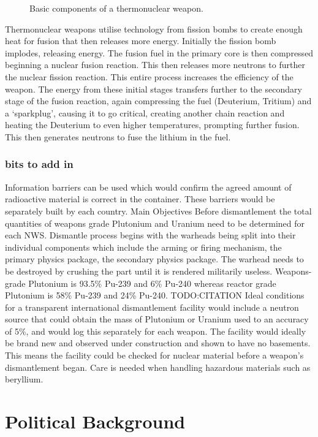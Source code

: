 \documentclass[twoside,titlepage,11pt,twocolumn,a4paper]{article}
\begin{document}
\begin{figure}
  
  \caption{Basic components of a thermonuclear weapon.
    \citep{thermonuclearBomb}}
\end{figure}

Thermonuclear weapons utilise technology from fission bombs to create
enough heat for fusion that then releases more energy.  Initially the
fission bomb implodes, releasing energy. The fusion fuel in the
primary core is then compressed beginning a nuclear fusion
reaction. This then releases more neutrons to further the nuclear
fission reaction. This entire process increases the efficiency of the
weapon. The energy from these initial stages transfers further to the
secondary stage of the fusion reaction, again compressing the fuel
(Deuterium, Tritium) and a `sparkplug', causing it to go critical,
creating another chain reaction and heating the Deuterium to even
higher temperatures, prompting further fusion. This then generates
neutrons to fuse the lithium in the fuel.

\subsubsection{bits to add in}
Information barriers can be used which would confirm the agreed amount
of radioactive material is correct in the container. These barriers
would be separately built by each country.  Main Objectives Before
dismantlement the total quantities of weapons grade Plutonium and
Uranium need to be determined for each NWS.  Dismantle process begins
with the warheads being split into their individual components which
include the arming or firing mechanism, the primary physics package,
the secondary physics package.  The warhead needs to be destroyed by
crushing the part until it is rendered militarily useless.
Weapons-grade Plutonium is 93.5\% Pu-239 and 6\% Pu-240 whereas
reactor grade Plutonium is 58\% Pu-239 and 24\% Pu-240. TODO:CITATION
Ideal conditions for a transparent international dismantlement
facility would include a neutron source that could obtain the mass of
Plutonium or Uranium used to an accuracy of 5\%, and would log this
separately for each weapon.  The facility would ideally be brand new
and observed under construction and shown to have no basements. This
means the facility could be checked for nuclear material before a
weapon’s dismantlement began.  Care is needed when handling hazardous
materials such as beryllium.

\section{Political Background}
\end{document}

